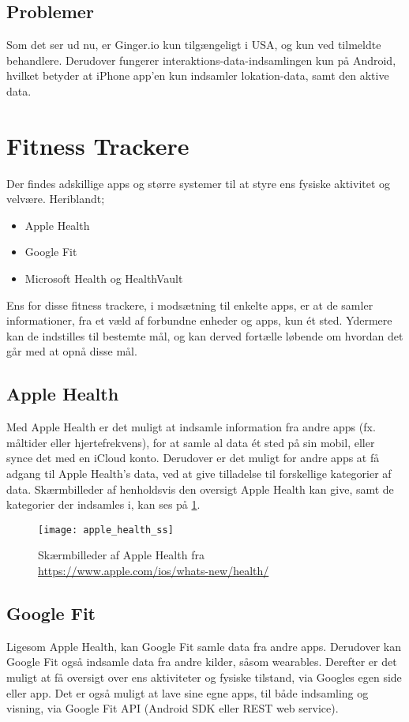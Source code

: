 \subsection{Problemer}
Som det ser ud nu, er Ginger.io kun tilgængeligt i USA, og kun ved tilmeldte behandlere.
Derudover fungerer interaktions-data-indsamlingen kun på Android, hvilket betyder at iPhone app'en kun indsamler lokation-data, samt den aktive data.

\section{Fitness Trackere}
Der findes adskillige apps og større systemer til at styre ens fysiske aktivitet og velvære.
Heriblandt;
\begin{itemize}
\item Apple Health\cite{apple_health}
\item Google Fit\cite{google_fit}\cite{google_fit_api}
\item Microsoft Health\cite{ms_health} og HealthVault\cite{ms_health_vault}\cite{ms_health_vault_api}
\end{itemize}

Ens for disse fitness trackere, i modsætning til enkelte apps, er at de samler informationer, fra et væld af forbundne enheder og apps, kun ét sted.
Ydermere kan de indstilles til bestemte mål, og kan derved fortælle løbende om hvordan det går med at opnå disse mål.

\subsection{Apple Health}
Med Apple Health er det muligt at indsamle information fra andre apps (fx. måltider eller hjertefrekvens), for at samle al data ét sted på sin mobil, eller synce det med en iCloud konto.
Derudover er det muligt for andre apps at få adgang til Apple Health's data, ved at give tilladelse til forskellige kategorier af data.
Skærmbilleder af henholdsvis den oversigt Apple Health kan give, samt de kategorier der indsamles i, kan ses på \cref{eksisterende_systemer:apple_health_ss}.

\begin{figure}
\centering
\texttt{[image: apple\_health\_ss]}
\caption{Skærmbilleder af Apple Health fra \url{https://www.apple.com/ios/whats-new/health/}}
\label{eksisterende_systemer:apple_health_ss}
\end{figure}

\subsection{Google Fit}
Ligesom Apple Health, kan Google Fit samle data fra andre apps.
Derudover kan Google Fit også indsamle data fra andre kilder, såsom wearables.
Derefter er det muligt at få oversigt over ens aktiviteter og fysiske tilstand, via Googles egen side eller app.
Det er også muligt at lave sine egne apps, til både indsamling og visning, via Google Fit API (Android SDK eller REST web service).

